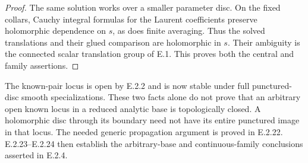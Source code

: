 \begin{proof}
The same solution works over a smaller parameter
disc.  On the fixed collars, Cauchy integral
formulas for the Laurent coefficients preserve
holomorphic dependence on $s$, as does finite
averaging.  Thus the solved translations and
their glued comparison are holomorphic in
$s$.  Their ambiguity is the connected
scalar translation group of E.1.  This
proves both the central and family assertions.
\end{proof}

\begin{remark}[Scope of E.2.21]
The known-pair locus is open by E.2.2 and
is now stable under full punctured-disc
smooth specializations.  These two facts
alone do not prove that an arbitrary open
known locus in a reduced analytic base
is topologically closed.  A holomorphic
disc through its boundary need not have
its entire punctured image in that locus.
The needed generic propagation argument
is proved in E.2.22.  E.2.23--E.2.24 then
establish the arbitrary-base and continuous-family
conclusions asserted in E.2.4.
\end{remark}
